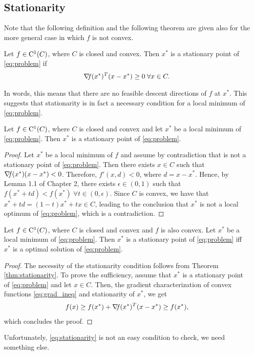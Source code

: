 \documentclass[10pt,a4paper]{article}
\begin{document}
\subsection{Stationarity}
Note that the following definition and the following theorem are given also for the more general case in which $f$ is not convex.
\begin{definition}
	Let $f\in \mathord{\mathrm{C^1}}(C)$, where $C$ is closed and convex. Then $x^*$ is a stationary point of \eqref{eq:problem} if
	\begin{equation}\label{eq:stationarity}
	 \operatorname*{\mathit{\nabla \!f}}(x^*)^T(x-x^*)\geq 0 \; \forall x\in C.
\end{equation}
\end{definition}
\noindent In words, this means that there are no feasible descent directions of $f$ at $x^*$. This suggests that stationarity is in fact a necessary condition for a local minimum of \eqref{eq:problem}.
\begin{theorem}\label{thm:stationarity}
	Let $f\in \mathord{\mathrm{C^1}}(C)$, where $C$ is closed and convex and let $x^*$ be a local minimum of \eqref{eq:problem}. Then $x^*$ is a stationary point of \eqref{eq:problem}.
\end{theorem}
\begin{proof}
	Let $x^*$ be a local minimum of $f$ and assume by contradiction that is not a stationary point of \eqref{eq:problem}. Then there exists $x\in C$ such that $\operatorname*{\mathit{\nabla \!f}}(x^*)(x-x^*)< 0$. Therefore, $f'(x,d)<0$, where $d=x-x^*$. Hence, by Lemma 1.1 of Chapter 2, there exists $\epsilon\in(0,1)$ such that $f(x^*+td)<f(x^*)\;\forall t\in(0,\epsilon).$ Since $C$ is convex, we have that $x^*+td = (1-t)x^*+tx\in C$, leading to the conclusion that $x^*$ is not a local optimum of \eqref{eq:problem}, which is a contradiction.
\end{proof}

\begin{theorem}\label{thm:convex_stationarity}
	Let $f\in \mathord{\mathrm{C^1}}(C)$, where $C$ is closed and convex and $f$ is also convex. Let $x^*$ be a local minimum of \eqref{eq:problem}. Then $x^*$ is a stationary point of \eqref{eq:problem} iff $x^*$ is a optimal solution of \eqref{eq:problem}.
\end{theorem}
\begin{proof}
	The necessity of the stationarity condition follows from Theorem \ref{thm:stationarity}. To prove the sufficiency, assume that $x^*$ is a stationary point of \eqref{eq:problem} and let $x\in C$. Then, the gradient characterization of convex functions \eqref{eq:grad_ineq} and stationarity of $x^*$, we get
	\begin{equation*}
		f(x) \geq f(x^*) +\operatorname*{\mathit{\nabla \!f}}(x^*)^T(x-x^*) \geq f(x^*),
	\end{equation*}
which concludes the proof.
\end{proof}
\noindent Unfortunately, \eqref{eq:stationarity} is not an easy condition to check, we need something else.
\end{document}
